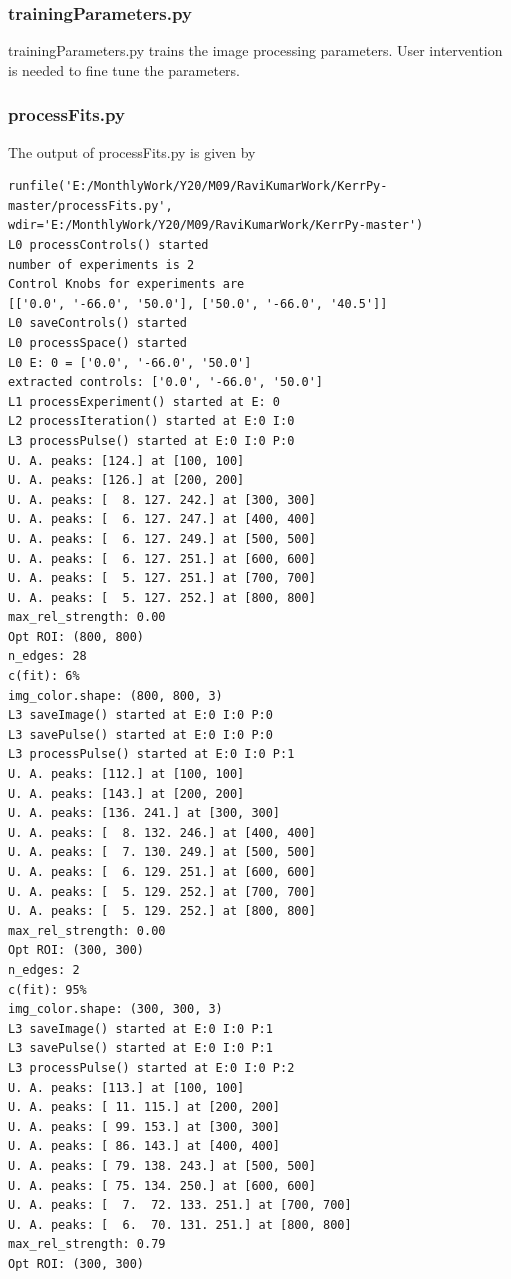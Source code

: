 \documentclass[12pt, twoside, a4paper]{article}
\begin{document}
\subsubsection{trainingParameters.py}
trainingParameters.py trains the image processing parameters. User intervention is needed to fine tune the parameters.
\subsubsection{processFits.py}
The output of processFits.py is given by
\begin{verbatim}
runfile('E:/MonthlyWork/Y20/M09/RaviKumarWork/KerrPy-master/processFits.py', wdir='E:/MonthlyWork/Y20/M09/RaviKumarWork/KerrPy-master')
L0 processControls() started
number of experiments is 2
Control Knobs for experiments are 
[['0.0', '-66.0', '50.0'], ['50.0', '-66.0', '40.5']]
L0 saveControls() started
L0 processSpace() started
L0 E: 0 = ['0.0', '-66.0', '50.0']
extracted controls: ['0.0', '-66.0', '50.0']
L1 processExperiment() started at E: 0
L2 processIteration() started at E:0 I:0
L3 processPulse() started at E:0 I:0 P:0
U. A. peaks: [124.] at [100, 100]
U. A. peaks: [126.] at [200, 200]
U. A. peaks: [  8. 127. 242.] at [300, 300]
U. A. peaks: [  6. 127. 247.] at [400, 400]
U. A. peaks: [  6. 127. 249.] at [500, 500]
U. A. peaks: [  6. 127. 251.] at [600, 600]
U. A. peaks: [  5. 127. 251.] at [700, 700]
U. A. peaks: [  5. 127. 252.] at [800, 800]
max_rel_strength: 0.00
Opt ROI: (800, 800)
n_edges: 28
c(fit): 6%
img_color.shape: (800, 800, 3)
L3 saveImage() started at E:0 I:0 P:0
L3 savePulse() started at E:0 I:0 P:0
L3 processPulse() started at E:0 I:0 P:1
U. A. peaks: [112.] at [100, 100]
U. A. peaks: [143.] at [200, 200]
U. A. peaks: [136. 241.] at [300, 300]
U. A. peaks: [  8. 132. 246.] at [400, 400]
U. A. peaks: [  7. 130. 249.] at [500, 500]
U. A. peaks: [  6. 129. 251.] at [600, 600]
U. A. peaks: [  5. 129. 252.] at [700, 700]
U. A. peaks: [  5. 129. 252.] at [800, 800]
max_rel_strength: 0.00
Opt ROI: (300, 300)
n_edges: 2
c(fit): 95%
img_color.shape: (300, 300, 3)
L3 saveImage() started at E:0 I:0 P:1
L3 savePulse() started at E:0 I:0 P:1
L3 processPulse() started at E:0 I:0 P:2
U. A. peaks: [113.] at [100, 100]
U. A. peaks: [ 11. 115.] at [200, 200]
U. A. peaks: [ 99. 153.] at [300, 300]
U. A. peaks: [ 86. 143.] at [400, 400]
U. A. peaks: [ 79. 138. 243.] at [500, 500]
U. A. peaks: [ 75. 134. 250.] at [600, 600]
U. A. peaks: [  7.  72. 133. 251.] at [700, 700]
U. A. peaks: [  6.  70. 131. 251.] at [800, 800]
max_rel_strength: 0.79
Opt ROI: (300, 300)

\end{verbatim}
\end{document}
